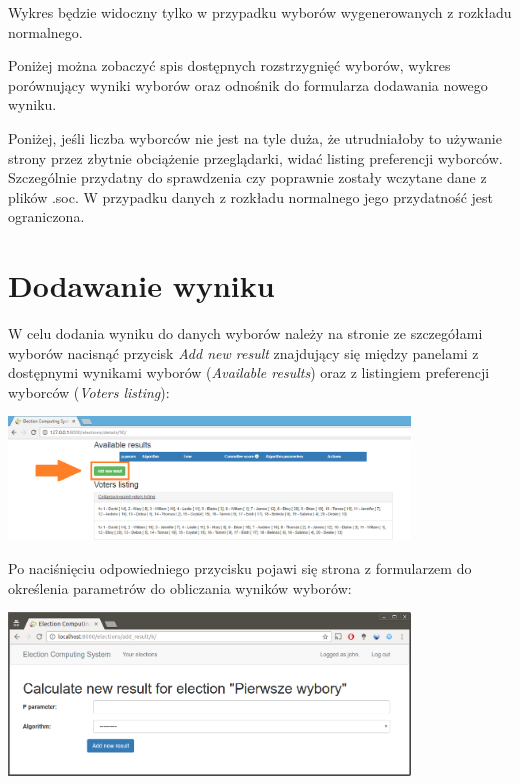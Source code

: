 \documentclass[pdflatex,11pt]{../aghdoc_version2}
\begin{document}
\vspace{\baselineskip}
Wykres będzie widoczny tylko w przypadku wyborów wygenerowanych z rozkładu normalnego.

Poniżej można zobaczyć spis dostępnych rozstrzygnięć wyborów, wykres porównujący wyniki wyborów oraz odnośnik do formularza dodawania nowego wyniku.

Poniżej, jeśli liczba wyborców nie jest na tyle duża, że utrudniałoby to używanie strony przez zbytnie obciążenie przeglądarki, widać listing preferencji wyborców. Szczególnie przydatny do sprawdzenia czy poprawnie zostały wczytane dane z plików .soc. W przypadku danych z rozkładu normalnego jego przydatność jest ograniczona.

\newpage
\section{Dodawanie wyniku}
\label{sec:dodawaniewyniku}

W celu dodania wyniku do danych wyborów należy na stronie ze szczegółami wyborów nacisnąć przycisk \textit{Add new result} znajdujący się między panelami z dostępnymi wynikami wyborów (\textit{Available results}) oraz z listingiem preferencji wyborców (\textit{Voters listing}): \\
\begin{center}
\includegraphics[width=0.8\textwidth]{pics/add_new_result_button.png}
\end{center}

\vspace{\baselineskip}
Po naciśnięciu odpowiedniego przycisku pojawi się strona z formularzem do określenia parametrów do obliczania wyników wyborów: \\
\begin{center}
\includegraphics[width=0.8\textwidth]{pics/new-result.png}
\end{center}
\end{document}
